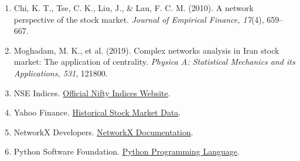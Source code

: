 \documentclass[11pt,a4paper]{article}
\begin{document}
\begin{enumerate}

    \item Chi, K. T., Tse, C. K., Liu, J., \& Lau, F. C. M.
    (2010). A network perspective of the stock market.
    \textit{Journal of Empirical Finance, 17}(4), 659--667.

    \item Moghadam, M. K., et al. (2019).
    Complex networks analysis in Iran stock market:
    The application of centrality.
    \textit{Physica A: Statistical Mechanics and its Applications,
    531}, 121800.

    \item NSE Indices.
    \href{https://www.niftyindices.com/}
    {Official Nifty Indices Website}.

    \item Yahoo Finance.
    \href{https://finance.yahoo.com/}
    {Historical Stock Market Data}.

    \item NetworkX Developers.
    \href{https://networkx.org/}
    {NetworkX Documentation}.

    \item Python Software Foundation.
    \href{https://www.python.org/}
    {Python Programming Language}.

\end{enumerate}
\end{document}
